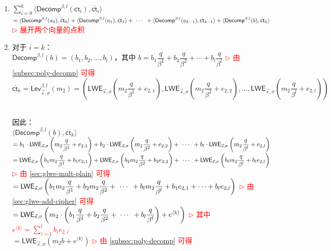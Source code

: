 \begin{myproof}
\begin{enumerate}
\item $\sum\limits_{i=0}^{k}\langle \textsf{Decomp}^{\beta, l}(\textsf{ct}_i), \bar{\textsf{ct}}_i \rangle$ \\
$= \langle \textsf{Decomp}^{\beta, l}(a_0), \bar{\textsf{ct}}_0 \rangle + \langle \textsf{Decomp}^{\beta, l}(a_1), \bar{\textsf{ct}}_1 \rangle + \text{ } \text{$\cdots$} \text{ } + \langle \textsf{Decomp}^{\beta, l}(a_{k-1}), \bar{\textsf{ct}}_{k-1} \rangle + \langle \textsf{Decomp}^{\beta, l}(b), \bar{\textsf{ct}}_k \rangle$ \\
\textcolor{red}{ $\rhd$ 展开两个向量的点积}
\item 对于 $i = k$： \\
$\textsf{Decomp}^{\beta, l}(b) = (b_1, b_2, \ldots , b_l)$，其中 $b = b_1\dfrac{q}{\beta^1} + b_2\dfrac{q}{\beta^2} + \cdots + b_l\dfrac{q}{\beta^l}$ \textcolor{red}{ $\rhd$ 由 \autoref{subsec:poly-decomp} 可得}\\
$\bar{\textsf{ct}}_k = \textsf{Lev}_{\vec{s}, \sigma}^{\beta, l}(m_2) = \left(\textsf{LWE}_{\vec{s}, \sigma}\left(m_{2}\dfrac{q}{\beta^1} + e_{2, 1}\right), \textsf{LWE}_{\vec{s}, \sigma}\left(m_{2}\dfrac{q}{\beta^2} + e_{2, 2}\right), \ldots, \textsf{LWE}_{\vec{s}, \sigma}\left(m_{2}\dfrac{q}{\beta^l} + e_{2, l}\right) \right)$ \\
$ $

因此： \\
$\langle \textsf{Decomp}^{\beta, l}(b), \bar{\textsf{ct}}_k \rangle$\\
$= b_1 \cdot \textsf{LWE}_{\vec{s}, \sigma} \left (m_{2}\dfrac{q}{\beta^1}  + e_{2, 1}\right ) + b_2 \cdot \textsf{LWE}_{\vec{s}, \sigma} \left (m_{2}\dfrac{q}{\beta^2}  + e_{2, 2}\right ) + \text{ } \text{$\cdots$} \text{ } + b_l \cdot \textsf{LWE}_{\vec{s}, \sigma} \left (m_{2}\dfrac{q}{\beta^l}  + e_{2, l}\right)$ \\
$= \textsf{LWE}_{\vec{s}, \sigma} \left (b_1m_{2}\dfrac{q}{\beta^1}  + b_1e_{2, 1}\right ) + \textsf{LWE}_{\vec{s}, \sigma} \left (b_2m_{2}\dfrac{q}{\beta^2}  + b_2e_{2,2}\right ) + \text{ } \text{$\cdots$} \text{ } + \textsf{LWE}_{\vec{s}, \sigma} \left (b_lm_{2}\dfrac{q}{\beta^l} + b_le_{2, l}\right)$ \textcolor{red}{ $\rhd$ 由 \autoref{sec:glwe-mult-plain} 可得} \\
$= \textsf{LWE}_{\vec{s}, \sigma} \left (b_1m_{2}\dfrac{q}{\beta^1} + b_2m_{2}\dfrac{q}{\beta^2} + \text{ } \text{$\cdots$} \text{ } + b_lm_{2}\dfrac{q}{\beta^l} + b_1e_{2,1} + \cdots + b_le_{2,l}\right)$ \textcolor{red}{ $\rhd$ 由 \autoref{sec:glwe-add-cipher} 可得}\\
$= \textsf{LWE}_{\vec{s}, \sigma} \left (m_{2} \cdot \left ( b_1\dfrac{q}{\beta^1} + b_2\dfrac{q}{\beta^2} + \text{ } \text{$\cdots$} \text{ } + b_l\dfrac{q}{\beta^l} \right)+e^{\langle k \rangle}\right)$ \textcolor{red}{ $\rhd$ 其中 $e^{\langle k \rangle} = \sum\limits_{i=1}^{l}b_ie_{2, i}$}\\
$= \textsf{LWE}_{\vec{s}, \sigma} (m_{2}b + e^{\langle k \rangle})$ \textcolor{red}{ $\rhd$ 由 \autoref{subsec:poly-decomp} 可得}


\end{enumerate}
\end{myproof}
